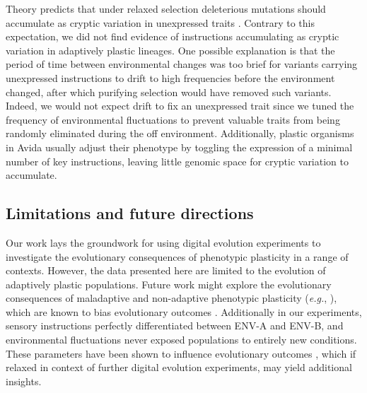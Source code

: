 Theory predicts that under relaxed selection deleterious mutations should accumulate as cryptic variation in unexpressed traits \citep{lahti_relaxed_2009}.
Contrary to this expectation, we did not find evidence of  instructions accumulating as cryptic variation in adaptively plastic lineages.
One possible explanation is that the period of time between environmental changes was too brief for variants carrying unexpressed  instructions to drift to high frequencies before the environment changed, after which purifying selection would have removed such variants.
Indeed, we would not expect drift to fix an unexpressed trait since we tuned the frequency of environmental fluctuations to prevent valuable traits from being randomly eliminated during the off environment.
Additionally, plastic organisms in Avida usually adjust their phenotype by toggling the expression of a minimal number of key instructions, leaving little genomic space for cryptic variation to accumulate.

\subsection{Limitations and future directions}


Our work lays the groundwork for using digital evolution experiments to investigate the evolutionary consequences of phenotypic plasticity in a range of contexts.
However, the data presented here are limited to the evolution of adaptively plastic populations.
Future work might explore the evolutionary consequences of maladaptive and non-adaptive phenotypic plasticity (\textit{e.g.}, \citealt{leroi_temperature_1994}), which are known to bias evolutionary outcomes \citep{ghalambor_non-adaptive_2015}. 
Additionally in our experiments, sensory instructions perfectly differentiated between ENV-A and ENV-B, and environmental fluctuations never exposed populations to entirely new conditions.
These parameters have been shown to influence evolutionary outcomes \citep{li_digital_2004,boyer_adaptation_2021} , which if relaxed in context of further digital evolution experiments, may yield additional insights.

